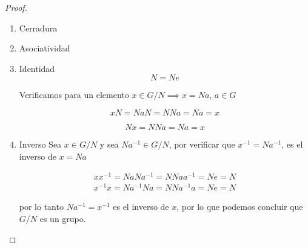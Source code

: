 	\begin{proof}
		\begin{enumerate}[i]
			\item Cerradura

			\item Asociatividad

			\item Identidad
			\begin{equation}
				N = N e
			\end{equation}

			Verificamos para un elemento $x \in G/N \implies x = N a$, $a\in G$

			\begin{equation}
				x N = N a N = N N a = N a = x \nonumber
			\end{equation}

			\begin{equation}
				N x = N N a = N a = x
			\end{equation}
			\item Inverso
			Sea $x \in G/N$ y sea $N a^{-1} \in G/N$, por verificar que $x^{-1} = N a^{-1}$, es el inverso de $x = N a$

			\begin{eqnarray}
				x x^{-1} = N a N a^{-1} = N N a a^{-1} = N e = N \\
				x^{-1} x = N a^{-1} N a = N N a^{-1} a = N e = N
			\end{eqnarray}

			por lo tanto $N a^{-1} = x^{-1}$ es el inverso de $x$, por lo que podemos concluir que $G/N$ es un grupo.

		\end{enumerate}
	\end{proof}